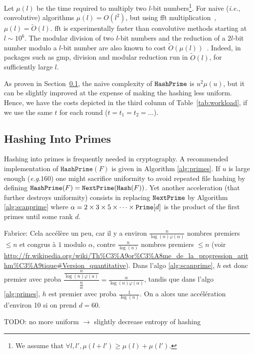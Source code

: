 \documentclass[11pt]{llncs}
\newcommand{\Oapp}{\ensuremath{\tilde{O}}}
\newcommand{\ie}{\textit{i.e.}\xspace}
\newcommand{\eg}{\textit{e.g.}\xspace}
\newcommand{\Hash}{\ensuremath{\mathtt{Hash}}}
\newcommand{\HashPrime}{\ensuremath{\mathtt{HashPrime}}}
\newcommand{\comm}[1]{\marginpar{%
\vskip-\baselineskip %
\raggedright\footnotesize
\itshape\hrule\smallskip#1\par\smallskip\hrule}}
\begin{document}
Let $\mu(l)$ be the time required to multiply two $l$-bit numbers\footnote{We assume that $\forall l,l', \mu(l+l') \ge \mu(l) + \mu(l')$.}.
For naive (\ie, convolutive) algorithms $\mu(l) = O(l^2)$, but using {\sc fft} multiplication~\cite{schonhage1971schnelle}, $\mu(l) = \Oapp(l)$. {\sc fft} is experimentally faster than convolutive methods starting at $l \sim 10^6$.
The modular division of two $l$-bit numbers and the reduction of a $2l$-bit number modulo a $l$-bit number are also known to cost $\Oapp(\mu(l))$~\cite{burnikel1998fast}.
Indeed, in packages such as {\sf gmp}, division and modular reduction run in $\Oapp(l)$, for sufficiently large $l$.

As proven in Section~\ref{sec:hashprime}, the naive complexity of $\tt HashPrime$ is $u^2 \mu(u)$, but it can be slightly improved at the expense of making the hashing less uniform.
Hence, we have the costs depicted in the third column of Table~\ref{tab:workload}, if we use the same $t$ for each round ($t=t_1=t_2=\dots$).

\subsection{Hashing Into Primes}
\label{sec:hashprime}
Hashing into primes is frequently needed in cryptography. A recommended implementation of $\HashPrime(F)$ is given in Algorithm \ref{alg:primes}. If $u$ is large enough (\eg $160$) one might sacrifice uniformity to avoid repeated file hashing by defining $\HashPrime(F)=\mbox{{\tt NextPrime}}(\Hash(F))$. 
Yet another acceleration (that further destroys uniformity) consists in replacing $\mbox{{\tt NextPrime}}$ by Algorithm \ref{alg:scanprime} where $\alpha=2\times 3\times 5\times \cdots \times \mbox{{\tt Prime}}[d]$ is the product of the first primes until some rank $d$.
\comm{analyse ci-contre}

Fabrice: Cela accélère un peu, car il y a environ $\frac{n}{\log(n) \varphi(\alpha)}$ nombres premiers $\le n$ et congrus à $1$ modulo $\alpha$, contre $\frac{n}{\log(n)}$ nombres premiers $\le n$ (voir \url{http://fr.wikipedia.org/wiki/Th%C3%A9or%C3%A8me_de_la_progression_arithm%C3%A9tique#Version_quantitative}).
Dans l'algo \ref{alg:scanprime}, $h$ est donc premier avec proba $\dfrac{\frac{n}{\log(n) \varphi(a)}}{\frac{n}{\alpha}} = \frac{\alpha}{\log(n) \varphi(\alpha)}$, tandis que dans l'algo \ref{alg:primes}, $h$ est premier avec proba $\frac{1}{\log(n)}$.
On a alors une accélération d'environ 10 si on prend $d=60$.

TODO: no more uniform $\longrightarrow$ slightly decrease entropy of hashing
\end{document}
